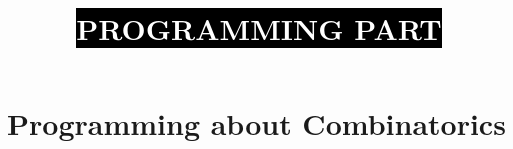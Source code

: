 \begin{center}
	\title{\sffamily\colorbox{black}{\bfseries\textcolor{white}{\Large PROGRAMMING PART}}}
\end{center}
\section{Programming about Combinatorics}
